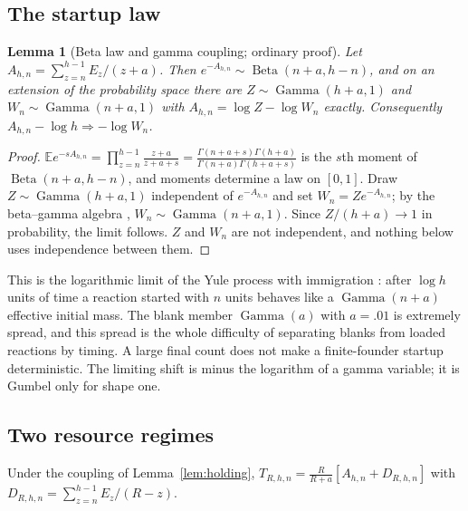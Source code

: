 \documentclass[11pt,a4paper]{article}
\theoremstyle{plain}
\newtheorem{lemma}[theorem]{Lemma}
\theoremstyle{definition}
\theoremstyle{remark}
\newcommand{\E}{\mathbb E}
\newcommand{\Gam}{\operatorname{Gamma}}
\newcommand{\Bet}{\operatorname{Beta}}
\begin{document}
\subsection{The startup law}
\begin{lemma}[Beta law and gamma coupling; ordinary proof]\label{lem:beta}
Let $A_{h,n}=\sum_{z=n}^{h-1}E_z/(z+a)$. Then $e^{-A_{h,n}}\sim\Bet(n+a,h-n)$, and on an extension of the probability space there are $Z\sim\Gam(h+a,1)$ and $W_n\sim\Gam(n+a,1)$ with $A_{h,n}=\log Z-\log W_n$ exactly. Consequently $A_{h,n}-\log h\Rightarrow-\log W_n$.
\end{lemma}
\begin{proof}
$\E e^{-sA_{h,n}}=\prod_{z=n}^{h-1}\frac{z+a}{z+a+s}=\frac{\Gamma(n+a+s)\Gamma(h+a)}{\Gamma(n+a)\Gamma(h+a+s)}$ is the $s$th moment of $\Bet(n+a,h-n)$, and moments determine a law on $[0,1]$. Draw $Z\sim\Gam(h+a,1)$ independent of $e^{-A_{h,n}}$ and set $W_n=Ze^{-A_{h,n}}$; by the beta--gamma algebra \citep{lukacs1955}, $W_n\sim\Gam(n+a,1)$. Since $Z/(h+a)\to1$ in probability, the limit follows. $Z$ and $W_n$ are not independent, and nothing below uses independence between them.
\end{proof}
This is the logarithmic limit of the Yule process with immigration \citep{kendall1948}: after $\log h$ units of time a reaction started with $n$ units behaves like a $\Gam(n+a)$ effective initial mass. The blank member $\Gam(a)$ with $a=.01$ is extremely spread, and this spread is the whole difficulty of separating blanks from loaded reactions by timing. A large final count does not make a finite-founder startup deterministic. The limiting shift is minus the logarithm of a gamma variable; it is Gumbel only for shape one.

\subsection{Two resource regimes}
Under the coupling of Lemma~\ref{lem:holding}, $T_{R,h,n}=\frac{R}{R+a}[A_{h,n}+D_{R,h,n}]$ with $D_{R,h,n}=\sum_{z=n}^{h-1}E_z/(R-z)$.
\end{document}
